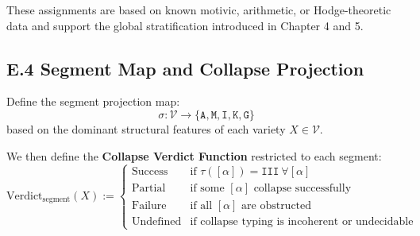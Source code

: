 \documentclass[11pt]{article}
\begin{document}
\begin{center}
\end{center}


These assignments are based on known motivic, arithmetic, or Hodge-theoretic data and support the global stratification introduced in Chapter 4 and 5.

\subsection*{E.4 Segment Map and Collapse Projection}

Define the segment projection map:
\[
\sigma : \mathcal{V} \longrightarrow \{ \texttt{A}, \texttt{M}, \texttt{I}, \texttt{K}, \texttt{G} \}
\]
based on the dominant structural features of each variety $X \in \mathcal{V}$.

We then define the \textbf{Collapse Verdict Function} restricted to each segment:
\[
\text{Verdict}_{\text{segment}}(X) :=
\begin{cases}
\text{Success} & \text{if } \tau([\alpha]) = \texttt{III} \ \forall [\alpha] \\
\text{Partial} & \text{if some } [\alpha] \text{ collapse successfully} \\
\text{Failure} & \text{if all } [\alpha] \text{ are obstructed} \\
\text{Undefined} & \text{if collapse typing is incoherent or undecidable}
\end{cases}
\]
\end{document}
